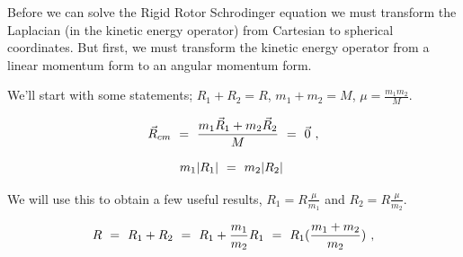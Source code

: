 \documentclass{article}
\begin{document}
Before we can solve the Rigid Rotor Schrodinger equation we must transform the Laplacian (in the kinetic energy operator) from Cartesian to spherical coordinates. But first, we must transform the kinetic energy operator from a linear momentum form to an angular momentum form. 

We'll start with some statements; \begin{math} R_1 + R_2 = R \end{math}, \begin{math} m_1 + m_2 = M \end{math}, \begin{math} \mu = \frac{m_1 m_2}{M} \end{math}.

\begin{equation} \label{eb-eq-256-33}
\vec{R}_{cm} \hspace{0.125cm} = \hspace{0.125cm} \frac{m_1 \vec{R}_1 + m_2 \vec{R}_2}{M} \hspace{0.125cm} = \hspace{0.125cm} \vec{0} \hspace{0.125cm} ,
\end{equation}

\begin{equation} \label{eb-eq-256-34}
 m_1 | R_1 | \hspace{0.125cm} = \hspace{0.125cm} m_2 | R_2 | \hspace{0.125cm} 
\end{equation}

We will use this to obtain a few useful results, \begin{math} R_1 = R \frac{\mu}{m_1} \end{math} and \begin{math} R_2 = R \frac{\mu}{m_2} \end{math}.

\begin{equation} \label{eb-eq-256-35}
R \hspace{0.125cm} = \hspace{0.125cm} R_1 + R_2 \hspace{0.125cm} = \hspace{0.125cm} R_1 + \frac{m_1}{m_2} R_1 \hspace{0.125cm} = \hspace{0.125cm} R_1 (\frac{m_1 + m_2}{m_2} ) \hspace{0.125cm} , 
\end{equation}
\end{document}
